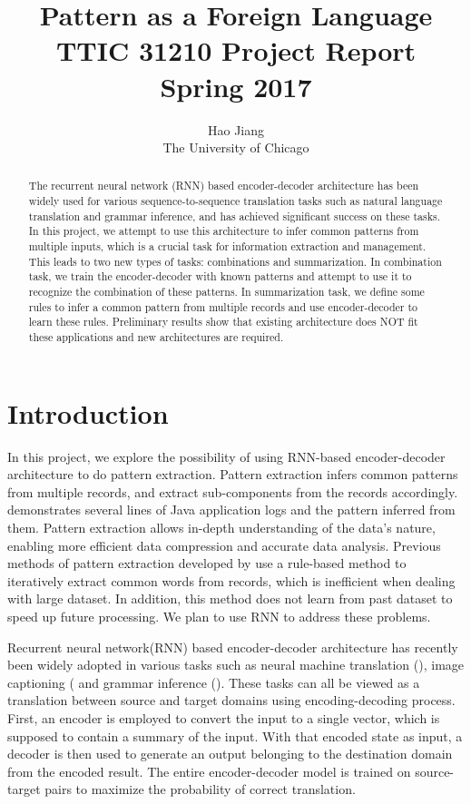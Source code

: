 \documentclass{article}
\title{\LARGE{Pattern as a Foreign Language} \\ \large{TTIC 31210 Project Report \\ Spring 2017}}
\author{Hao Jiang \\ The University of Chicago}
\begin{document}
\maketitle

\begin{abstract}
The recurrent neural network (RNN) based encoder-decoder architecture has been widely used for various sequence-to-sequence translation tasks such as natural language translation and grammar inference, and has achieved significant success on these tasks. In this project, we attempt to use this architecture to infer common patterns from multiple inputs, which is a crucial task for information extraction and management. This leads to two new types of tasks: combinations and summarization. In combination task, we train the encoder-decoder with known patterns and attempt to use it to recognize the combination of these patterns. In summarization task, we define some rules to infer a common pattern from multiple records and use encoder-decoder to learn these rules. Preliminary results show that existing architecture does NOT fit these applications and new architectures are required.
\end{abstract}

\section{Introduction}
In this project, we explore the possibility of using RNN-based encoder-decoder architecture to do pattern extraction. Pattern extraction infers common patterns from multiple records, and extract sub-components from the records accordingly.  demonstrates several lines of Java application logs and the pattern inferred from them. Pattern extraction allows in-depth understanding of the data's nature, enabling more efficient data compression and accurate data analysis. Previous methods of pattern extraction developed by \cite{dirt_2008} use a rule-based method to iteratively extract common words from records, which is inefficient when dealing with large dataset. In addition, this method does not learn from past dataset to speed up future processing. We plan to use RNN to address these problems.

Recurrent neural network(RNN) based encoder-decoder architecture has recently been widely adopted in various tasks such as neural machine translation (\cite{ntran_2013, rnned_2014}), image captioning (\cite{icap_2015} and grammar inference (\cite{grammar_2014}). These tasks can all be viewed as a translation between source and target domains using encoding-decoding process. First, an encoder is employed to convert the input to a single vector, which is supposed to contain a summary of the input. With that encoded state as input, a decoder is then used to generate an output belonging to the destination domain from the encoded result. The entire encoder-decoder model is trained on  source-target pairs to maximize the probability of correct translation.
\end{document}
